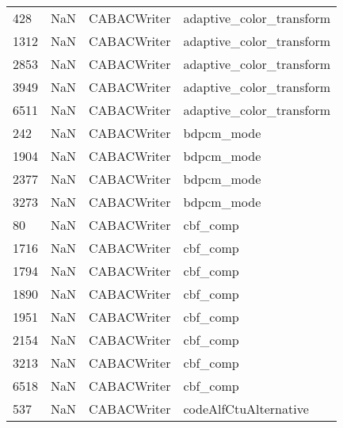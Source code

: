 \begin{tabular}{llll}
428  &                   NaN &                CABACWriter &                  adaptive\_color\_transform \\
1312 &                   NaN &                CABACWriter &                  adaptive\_color\_transform \\
2853 &                   NaN &                CABACWriter &                  adaptive\_color\_transform \\
3949 &                   NaN &                CABACWriter &                  adaptive\_color\_transform \\
6511 &                   NaN &                CABACWriter &                  adaptive\_color\_transform \\
242  &                   NaN &                CABACWriter &                                bdpcm\_mode \\
1904 &                   NaN &                CABACWriter &                                bdpcm\_mode \\
2377 &                   NaN &                CABACWriter &                                bdpcm\_mode \\
3273 &                   NaN &                CABACWriter &                                bdpcm\_mode \\
80   &                   NaN &                CABACWriter &                                  cbf\_comp \\
1716 &                   NaN &                CABACWriter &                                  cbf\_comp \\
1794 &                   NaN &                CABACWriter &                                  cbf\_comp \\
1890 &                   NaN &                CABACWriter &                                  cbf\_comp \\
1951 &                   NaN &                CABACWriter &                                  cbf\_comp \\
2154 &                   NaN &                CABACWriter &                                  cbf\_comp \\
3213 &                   NaN &                CABACWriter &                                  cbf\_comp \\
6518 &                   NaN &                CABACWriter &                                  cbf\_comp \\
537  &                   NaN &                CABACWriter &                     codeAlfCtuAlternative \\

\end{tabular}
